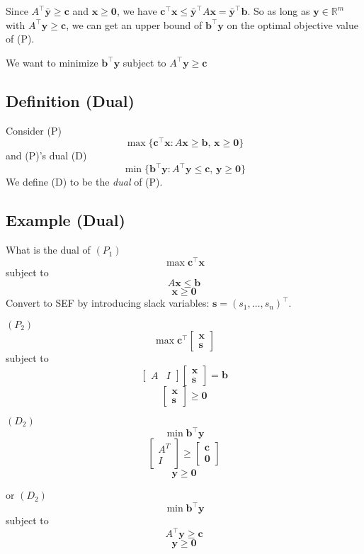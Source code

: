 Since $ A ^\top \bm{\bar{y}}\ge \bm{c} $ and $ \bm{x}\ge \bm{0} $,
we have $ \bm{c}^\top \bm{x}\le \bm{\bar{y}}^\top A \bm{x} =
\bm{\bar{y}}^\top \bm{b} $. So as long as $ \bm{y}\in\mathbb{R}^m $
with $ A ^\top \bm{y}\ge \bm{c} $, we can get an upper bound
of $ \bm{b} ^\top\bm{y} $ on the optimal objective value of (P).

We want to minimize $ \bm{b}^\top\bm{y} $ subject to $ A ^\top \bm{y}\ge \bm{c} $

\begin{defbox}
    \subsection{Definition (Dual)}
    Consider (P)
    \[ \max \{\bm{c}^{\top} \bm{x}: A \bm{x} \geq \bm{b},\, \bm{x} \geq \bm{0}\} \]
    and (P)'s dual (D)
    \[ \min \{\bm{b}^{\top} \bm{y}: A^{\top} \bm{y} \leq \bm{c},\, \bm{y} \geq \bm{0}\}\]
    We define (D) to be the \emph{dual} of (P).
\end{defbox}

\subsection{Example (Dual)}
What is the dual of
$ (P_1) $
\[ \max \bm{c}^\top \bm{x} \]
subject to
\[ A \bm{x}\le \bm{b} \]
\[ \bm{x}\ge \bm{0} \]
Convert to SEF by introducing slack variables: $ \bm{s}=(s_1,\ldots,s_n)^\top $.

$ (P_2) $
\[ \max \bm{c}^\top
\begin{bmatrix}
    \bm{x}\\
    \bm{s}
\end{bmatrix} \]
subject to
\[ \left[ \begin{array}{c|c}
    A & I
\end{array} \right]
\begin{bmatrix}
    \bm{x}\\
    \bm{s}
\end{bmatrix} = \bm{b} \]
\[ \begin{bmatrix}
    \bm{x}\\
    \bm{s}
\end{bmatrix}\ge \bm{0} \]

$ (D_2) $
\[ \min \bm{b}^\top \bm{y} \]
\[ \begin{bmatrix}
    A^T\\
    I
\end{bmatrix} \ge
\begin{bmatrix}
    \bm{c}\\
    \bm{0}
\end{bmatrix}\]
\[ \bm{y}\ge \bm{0} \]

or
$ (D_2) $
\[ \min \bm{b}^\top \bm{y} \]
subject to
\[ A ^\top \bm{y}\ge \bm{c} \]
\[ \bm{y}\ge \bm{0} \]